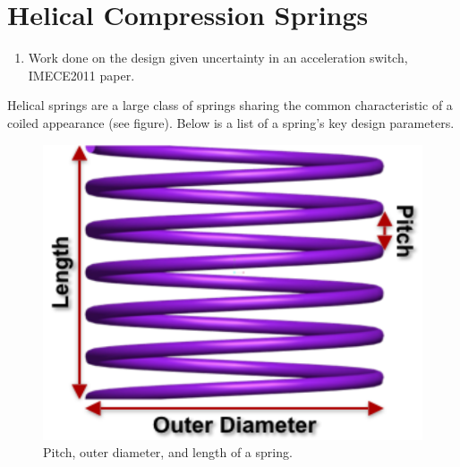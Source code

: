 \documentclass[11pt]{article}
\begin{document}
	\section{Helical Compression Springs}
	
	\begin{enumerate}
		
		\item Work done on the design given uncertainty in an acceleration switch, IMECE2011 paper.
		
	\end{enumerate}
		

Helical springs are a large class of springs sharing the common characteristic of a coiled appearance (see figure).  Below is a list of a spring's key design parameters.



		\begin{figure}[h]
			\begin{center}\includegraphics[scale=.2]{Spring_Description.png}\end{center}
			\label{Description1}
			\caption{Pitch, outer diameter, and length of a spring.}
			 \end{figure}
			 
\end{document}
